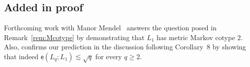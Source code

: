 \documentclass[11pt,reqno]{amsart}
\renewcommand{\ge}{\geqslant}
\newcommand{\ee}{\mathsf{e}}
\begin{document}
\subsection*{Added in proof} Forthcoming work with Manor Mendel~\cite{MN26} answers the question posed in Remark~\ref{rem:Mcotype}  by demonstrating  that $L_1$ has metric Markov cotype $2$. Also, \cite{MN26} confirms our prediction in the discussion following Corollary~8 by showing that indeed $\ee(L_q;L_1)\lesssim \sqrt{q}$ for every $q\ge 2$.  



%

\end{document}
